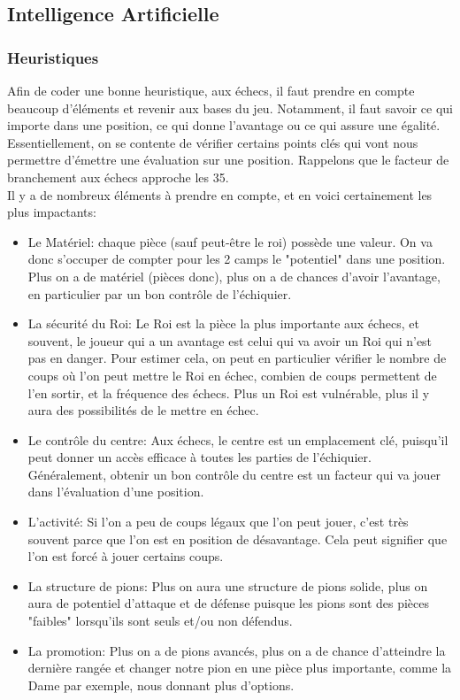 \documentclass{article}
\begin{document}
\subsection{Intelligence Artificielle} \label{AI}
\subsubsection{Heuristiques}
Afin de coder une bonne heuristique, aux échecs, il faut prendre en compte beaucoup d'éléments et revenir aux bases du jeu.
Notamment, il faut savoir ce qui importe dans une position, ce qui donne l'avantage ou ce qui assure une égalité. Essentiellement,
on se contente de vérifier certains points clés qui vont nous permettre d'émettre une évaluation sur une position.
Rappelons que le facteur de branchement aux échecs approche les 35.\\
Il y a de nombreux éléments à prendre en compte, et en voici certainement les plus impactants:
\begin{itemize}
    \item Le Matériel: chaque pièce (sauf peut-être le roi) possède une valeur. On va donc s'occuper de compter pour les 2 camps le "potentiel"
    dans une position. Plus on a de matériel (pièces donc), plus on a de chances d'avoir l'avantage, en particulier par un bon contrôle de l'échiquier.
    \item La sécurité du Roi: Le Roi est la pièce la plus importante aux échecs, et souvent, le joueur qui a un avantage est celui qui va
    avoir un Roi qui n'est pas en danger. Pour estimer cela, on peut en particulier vérifier le nombre de coups où l'on peut mettre le Roi en échec,
    combien de coups permettent de l'en sortir, et la fréquence des échecs. Plus un Roi est vulnérable, plus il y aura des possibilités
    de le mettre en échec.
    \item Le contrôle du centre: Aux échecs, le centre est un emplacement clé, puisqu'il peut donner un accès efficace à toutes les parties de
    l'échiquier. Généralement, obtenir un bon contrôle du centre est un facteur qui va jouer dans l'évaluation d'une position.
    \item L'activité: Si l'on a peu de coups légaux que l'on peut jouer, c'est très souvent parce que l'on est en position de désavantage. Cela peut
    signifier que l'on est forcé à jouer certains coups.
    \item La structure de pions: Plus on aura une structure de pions solide, plus on aura de potentiel d'attaque et de défense puisque les pions sont
    des pièces "faibles" lorsqu'ils sont seuls et/ou non défendus.
    \item La promotion: Plus on a de pions avancés, plus on a de chance d'atteindre la dernière rangée et changer notre pion en une pièce plus importante,
    comme la Dame par exemple, nous donnant plus d'options.
\end{itemize}
\end{document}
